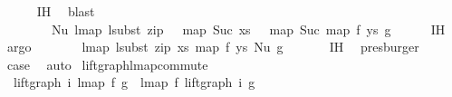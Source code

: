 \begin{isabellebody}
\ \ \ \ \isamarkupfalse%
\ IH\ \isamarkupfalse%
\ blast\isanewline
\ \ \isamarkupfalse%
\ \isamarkupfalse%
\ {\isachardoublequoteopen}{\isachardot}{\kern0pt}{\isachardot}{\kern0pt}{\isachardot}{\kern0pt}\ {\isacharequal}{\kern0pt}\isanewline
\ \ \ \ \ \ \ \ Nu\ {\isacharparenleft}{\kern0pt}{\isacharparenleft}{\kern0pt}lmap\ {\isacharparenleft}{\kern0pt}lsubst\ {\isacharparenleft}{\kern0pt}zip\ {\isacharparenleft}{\kern0pt}{}\ {\isacharhash}{\kern0pt}\ map\ Suc\ xs{\isacharparenright}{\kern0pt}\ {\isacharparenleft}{\kern0pt}{}\ {\isacharhash}{\kern0pt}\ map\ Suc\ {\isacharparenleft}{\kern0pt}map\ f\ ys{\isacharparenright}{\kern0pt}{\isacharparenright}{\kern0pt}{\isacharparenright}{\kern0pt}{\isacharparenright}{\kern0pt}\ g{\isacharparenright}{\kern0pt}{\isacharparenright}{\kern0pt}{\isachardoublequoteclose}\isanewline
\ \ \ \ \isamarkupfalse%
\ IH{}\ \isamarkupfalse%
\ argo\isanewline
\ \ \isamarkupfalse%
\ \isamarkupfalse%
\ {\isachardoublequoteopen}{\isachardot}{\kern0pt}{\isachardot}{\kern0pt}{\isachardot}{\kern0pt}\ {\isacharequal}{\kern0pt}\ lmap\ {\isacharparenleft}{\kern0pt}lsubst\ {\isacharparenleft}{\kern0pt}zip\ xs\ {\isacharparenleft}{\kern0pt}map\ f\ ys{\isacharparenright}{\kern0pt}{\isacharparenright}{\kern0pt}{\isacharparenright}{\kern0pt}\ {\isacharparenleft}{\kern0pt}Nu\ g{\isacharparenright}{\kern0pt}{\isachardoublequoteclose}\isanewline
\ \ \ \ \ \isamarkupfalse%
\ IH{}\ \isamarkupfalse%
\ presburger\isanewline
\ \ \isamarkupfalse%
\ \isamarkupfalse%
\ {\isacharquery}{\kern0pt}case\ \isakeywordONE{{\isachardot}{\kern0pt}}\isamarkupfalse%
\isanewline
{}\isamarkupfalse%
\ auto%
\endisatagproof
{\isafoldproof}%
%
\isadelimproof
%
\endisadelimproof
%
\isadelimdocument
%
\endisadelimdocument
%
\isatagdocument
%
\isamarkuptrue%
%
\isamarkuptrue%
%
\endisatagdocument
{\isafolddocument}%
%
\isadelimdocument
%
\endisadelimdocument
{}\isamarkupfalse%
\ lift{\isacharunderscore}{\kern0pt}graph{\isacharunderscore}{\kern0pt}lmap{\isacharunderscore}{\kern0pt}commute{\isacharcolon}{\kern0pt}\isanewline
\ \ {\isachardoublequoteopen}lift{\isacharunderscore}{\kern0pt}graph\ i\ {\isacharparenleft}{\kern0pt}lmap\ f\ g{\isacharparenright}{\kern0pt}\ {\isacharequal}{\kern0pt}\ lmap\ f\ {\isacharparenleft}{\kern0pt}lift{\isacharunderscore}{\kern0pt}graph\ i\ g{\isacharparenright}{\kern0pt}{\isachardoublequoteclose}\isanewline

\end{isabellebody}
